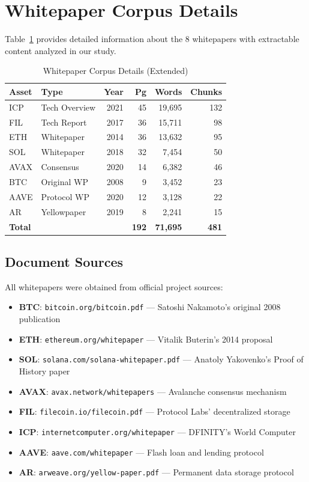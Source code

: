 \documentclass[11pt,twocolumn]{article}
\begin{document}
\section{Whitepaper Corpus Details}
\label{app:whitepapers}

Table~\ref{tab:whitepaper_corpus_full} provides detailed information about the 8 whitepapers with extractable content analyzed in our study.

\begin{table}[H]
\centering
\footnotesize
\caption{Whitepaper Corpus Details (Extended)}
\label{tab:whitepaper_corpus_full}
\begin{tabular}{@{}llrrrr@{}}
\toprule
\textbf{Asset} & \textbf{Type} & \textbf{Year} & \textbf{Pg} & \textbf{Words} & \textbf{Chunks} \\
\midrule
ICP & Tech Overview & 2021 & 45 & 19,695 & 132 \\
FIL & Tech Report & 2017 & 36 & 15,711 & 98 \\
ETH & Whitepaper & 2014 & 36 & 13,632 & 95 \\
SOL & Whitepaper & 2018 & 32 & 7,454 & 50 \\
AVAX & Consensus & 2020 & 14 & 6,382 & 46 \\
BTC & Original WP & 2008 & 9 & 3,452 & 23 \\
AAVE & Protocol WP & 2020 & 12 & 3,128 & 22 \\
AR & Yellowpaper & 2019 & 8 & 2,241 & 15 \\
\midrule
\textbf{Total} & & & \textbf{192} & \textbf{71,695} & \textbf{481} \\
\bottomrule
\end{tabular}
\end{table}

\subsection{Document Sources}

All whitepapers were obtained from official project sources:

\begin{itemize}
    \item \textbf{BTC}: \texttt{bitcoin.org/bitcoin.pdf} --- Satoshi Nakamoto's original 2008 publication
    \item \textbf{ETH}: \texttt{ethereum.org/whitepaper} --- Vitalik Buterin's 2014 proposal
    \item \textbf{SOL}: \texttt{solana.com/solana-whitepaper.pdf} --- Anatoly Yakovenko's Proof of History paper
    \item \textbf{AVAX}: \texttt{avax.network/whitepapers} --- Avalanche consensus mechanism
    \item \textbf{FIL}: \texttt{filecoin.io/filecoin.pdf} --- Protocol Labs' decentralized storage
    \item \textbf{ICP}: \texttt{internetcomputer.org/whitepaper} --- DFINITY's World Computer
    \item \textbf{AAVE}: \texttt{aave.com/whitepaper} --- Flash loan and lending protocol
    \item \textbf{AR}: \texttt{arweave.org/yellow-paper.pdf} --- Permanent data storage protocol
\end{itemize}
\end{document}
